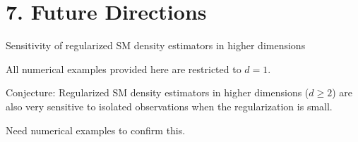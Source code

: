\documentclass[aspectratio=169,xcolor=dvipsnames]{beamer}
\begin{document}
\section{7. Future Directions}

%	
%	


\begin{frame}{Sensitivity of regularized SM density estimators in higher dimensions}
	
	All numerical examples provided here are restricted to $d = 1$. 
	
	\vspace{10pt}
	
	{\color{defaultcolor} Conjecture:} Regularized SM density estimators in higher dimensions ($d \ge 2$) are also very sensitive to isolated observations when the regularization is small. 
	
	\vspace{10pt}
		
	Need numerical examples to confirm this. 

\end{frame}


%	
%	
%	
%	
%	
\end{document}
